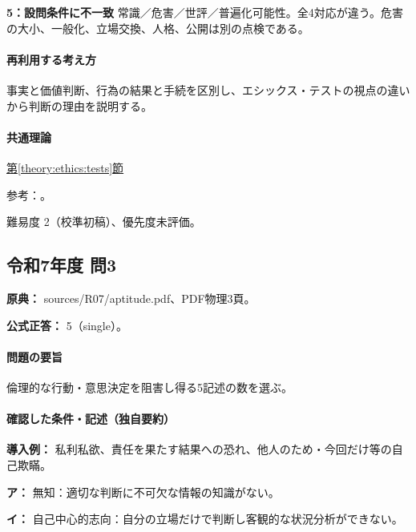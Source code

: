 \noindent\textbf{5：設問条件に不一致} 常識／危害／世評／普遍化可能性。全4対応が違う。危害の大小、一般化、立場交換、人格、公開は別の点検である。\par

\paragraph{再利用する考え方} 事実と価値判断、行為の結果と手続を区別し、エシックス・テストの視点の違いから判断の理由を説明する。

\paragraph{共通理論} \hyperref[theory:ethics:tests]{第\ref*{theory:ethics:tests}節}

\par 参考：\cite{davis_seven_steps}。

\par 難易度 2（校準初稿）、優先度未評価。

\subsection{令和7年度 問3}
\label{q:r07-reg-apt-03}

\noindent\textbf{原典：} sources/R07/aptitude.pdf、PDF物理3頁。

\textbf{公式正答：} 5（single）。

\paragraph{問題の要旨} 倫理的な行動・意思決定を阻害し得る5記述の数を選ぶ。

\paragraph{確認した条件・記述（独自要約）}\mbox{}\par

\noindent\textbf{導入例：} 私利私欲、責任を果たす結果への恐れ、他人のため・今回だけ等の自己欺瞞。\par

\noindent\textbf{ア：} 無知：適切な判断に不可欠な情報の知識がない。\par

\noindent\textbf{イ：} 自己中心的志向：自分の立場だけで判断し客観的な状況分析ができない。\par

